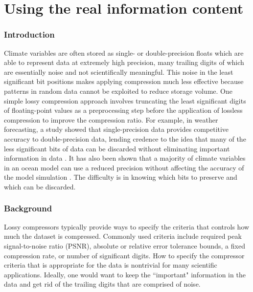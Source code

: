 

\chapter{Using the real information content\label{chapFour}}

\subsection{Introduction}

 Climate variables are often stored as single- or double-precision floats which are able to represent data at extremely high precision, many trailing digits of which are essentially noise and not scientifically meaningful. This noise in the least significant bit positions makes applying compression much less effective because patterns in random data cannot be exploited to reduce storage volume. One simple lossy compression approach involves truncating the least significant digits of floating-point values as a preprocessing step before the application of lossless compression to improve the compression ratio. For example, in weather forecasting, a study showed that single-precision data provides competitive accuracy to double-precision data, lending credence to the idea that many of the less significant bits of data can be discarded without eliminating important information in data \cite{SinglePrecisioninWeatherForecastingModelsAnEvaluationwiththeIFS}. It has also been shown that a majority of climate variables in an ocean model can use a reduced precision without affecting the accuracy of the model simulation \cite{gmd-12-3135-2019}. The difficulty is in knowing which bits to preserve and which can be discarded.



\subsection{Background\label{RICBackground}}

 Lossy compressors typically provide ways to specify the criteria that controls how much the dataset is compressed. Commonly used criteria include required peak signal-to-noise ratio (PSNR), absolute or relative error tolerance bounds, a fixed compression rate, or number of significant digits. How to specify the compressor criteria that is appropriate for the data is nontrivial for many scientific applications. Ideally, one would want to keep the ``important" information in the data and get rid of the trailing digits that are comprised of noise.
 
